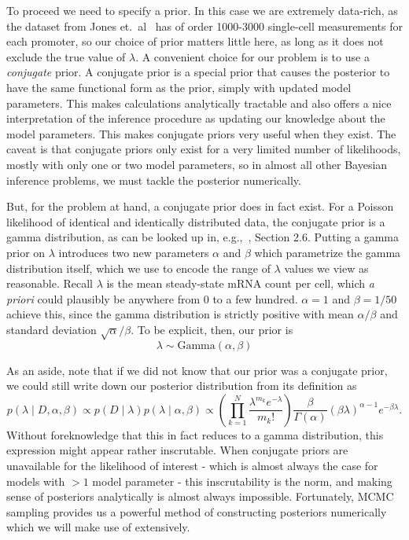 To proceed we need to specify a prior. In this case we are extremely data-rich,
as the dataset from Jones et.\ al~\cite{Jones2014} has of order 1000-3000
single-cell measurements for each promoter, so our choice of prior matters
little here, as long as it does not exclude the true value of $\lambda$. A
convenient choice for our problem is to use a \textit{conjugate} prior.
A conjugate prior is a special prior that causes the posterior to
have the same functional form as the prior, simply with updated
model parameters. This makes calculations
analytically tractable and also offers a nice interpretation of the inference
procedure as updating our knowledge about the model parameters.
This makes conjugate priors very useful when they exist.
The caveat is that conjugate priors only exist for a very limited
number of likelihoods, mostly with only one or two model
parameters, so in almost all other Bayesian inference problems,
we must tackle the posterior numerically.

But, for the problem at hand, a conjugate prior does in fact exist.
For a Poisson likelihood of identical and identically distributed
data, the conjugate prior is a gamma distribution, as
can be looked up in, e.g.,~\cite{Gelman2013}, Section 2.6.
Putting a gamma prior on $\lambda$ introduces two new parameters $\alpha$ and
$\beta$ which parametrize the gamma distribution itself, which we use to encode
the range of $\lambda$ values we view as reasonable. Recall $\lambda$ is the
mean steady-state mRNA count per cell, which \textit{a priori} could plausibly
be anywhere from 0 to a few hundred. $\alpha=1$ and $\beta=1/50$ achieve this,
since the gamma distribution is strictly positive with mean $\alpha/\beta$ and
standard deviation $\sqrt{\alpha}/\beta$. To be explicit, then, our prior is
\begin{equation}
\lambda \sim \text{Gamma}(\alpha, \beta)
\end{equation}

As an aside, note that if we did not know that our prior was a conjugate prior,
we could still write down our posterior distribution from its definition as
\begin{equation}
p(\lambda\mid D,\alpha,\beta)
\propto p(D\mid\lambda) p(\lambda \mid\alpha,\beta)
\propto \left(\prod_{k=1}^N \frac{\lambda^{m_k}e^{-\lambda}}{m_k!}\right)
        \frac{\beta}{\Gamma(\alpha)}(\beta\lambda)^{\alpha-1} e^{-\beta\lambda}
.
\end{equation}
Without foreknowledge that this in fact reduces to a gamma distribution, this
expression might appear rather inscrutable. When conjugate priors are
unavailable for the likelihood of interest - which is almost always the case for
models with $>1$ model parameter - this inscrutability is the norm, and making
sense of posteriors analytically is almost always impossible. Fortunately, MCMC
sampling provides us a powerful method of constructing posteriors numerically
which we will make use of extensively.

